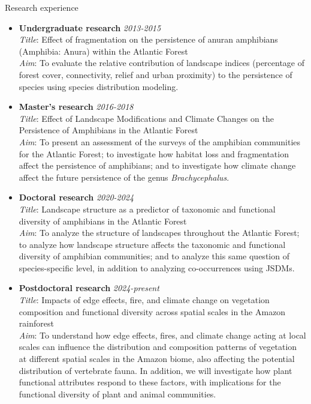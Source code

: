 \documentclass{resume}
\begin{document}

\begin{rSection}{Research experience}
\begin{itemize}
\item {\bf Undergraduate research} \hfill{\em 2013-2015}\\
{\it Title}: Effect of fragmentation on the persistence of anuran amphibians (Amphibia: Anura) within the Atlantic Forest\\
{\it Aim}: To evaluate the relative contribution of landscape indices (percentage of forest cover, connectivity, relief and urban proximity) to the persistence of species using species distribution modeling.

\item {\bf Master's research} \hfill{\em 2016-2018}\\
{\it Title}: Effect of Landscape Modifications and Climate Changes on the Persistence of Amphibians in the Atlantic Forest\\
{\it Aim}: To present an assessment of the surveys of the amphibian communities for the Atlantic Forest; to investigate how habitat loss and fragmentation affect the persistence of amphibians; and to investigate how climate change affect the future persistence of the genus {\it Brachycephalus}.

\item {\bf Doctoral research} \hfill{\em 2020-2024}\\
{\it Title}: Landscape structure as a predictor of taxonomic and functional diversity of amphibians in the Atlantic Forest\\
{\it Aim}: To analyze the structure of landscapes throughout the Atlantic Forest; to analyze how landscape structure affects the taxonomic and functional diversity of amphibian communities; and to analyze this same question of species-specific level, in addition to analyzing co-occurrences using JSDMs.

\item {\bf Postdoctoral research} \hfill{\em 2024-present}\\
{\it Title}: Impacts of edge effects, fire, and climate change on vegetation composition and functional diversity across spatial scales in the Amazon rainforest\\
{\it Aim}: To understand how edge effects, fires, and climate change acting at local scales can influence the distribution and composition patterns of vegetation at different spatial scales in the Amazon biome, also affecting the potential distribution of vertebrate fauna. In addition, we will investigate how plant functional attributes respond to these factors, with implications for the functional diversity of plant and animal communities.
\end{itemize}
\end{rSection}
\end{document}
